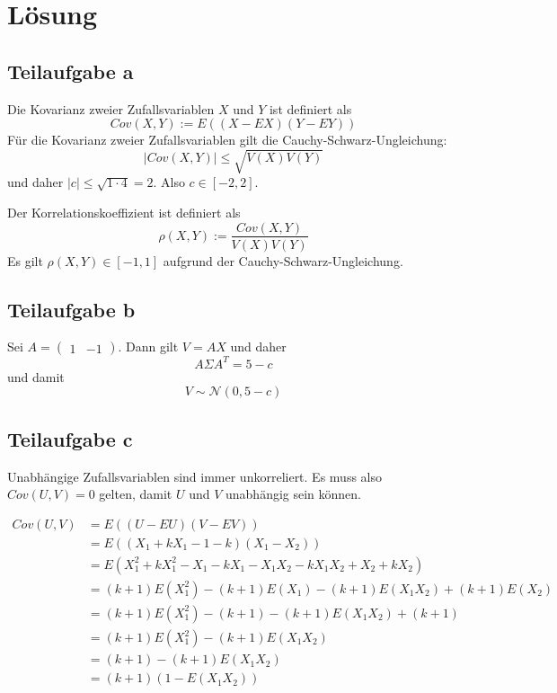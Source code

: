 \section*{Lösung}
\subsection*{Teilaufgabe a}
Die Kovarianz zweier Zufallsvariablen $X$ und $Y$ ist definiert als
\[Cov(X, Y) := E((X - EX) (Y - EY))\]
Für die Kovarianz zweier Zufallsvariablen gilt die Cauchy-Schwarz-Ungleichung:
\[|Cov(X, Y)| \leq \sqrt{V(X) V(Y)}\]
und daher $|c| \leq \sqrt{1 \cdot 4} = 2$. Also $c \in [-2, 2]$.

Der Korrelationskoeffizient ist definiert als
\[\rho(X, Y) := \frac{Cov(X, Y)}{V(X) V(Y)}\]
Es gilt $\rho(X, Y) \in [-1, 1]$ aufgrund der Cauchy-Schwarz-Ungleichung.

\subsection*{Teilaufgabe b}
Sei $A = \begin{pmatrix}1 & -1\end{pmatrix}$. Dann gilt $V = A X$ und daher
$$A \Sigma A^T = 5 - c$$ und damit
$$V \sim \mathcal{N}(0, 5 - c)$$

\subsection*{Teilaufgabe c}
Unabhängige Zufallsvariablen sind immer unkorreliert. Es muss also $Cov(U, V) = 0$
gelten, damit $U$ und $V$ unabhängig sein können.

\begin{align}
    Cov(U, V) &= E((U - EU) (V - EV))\\
              &= E((X_1 + k X_1 - 1 - k) (X_1 - X_2))\\
              &= E(X_1^2 + k X_1^2 - X_1 - k X_1 - X_1 X_2 - k X_1 X_2 + X_2 + k X_2)\\
              &= (k+1) E(X_1^2) - (k+1) E(X_1) - (k+1) E(X_1 X_2) + (k+1) E(X_2)\\
              &= (k+1) E(X_1^2) - (k+1) - (k+1) E(X_1 X_2) + (k+1)\\
              &= (k+1) E(X_1^2) - (k+1) E(X_1 X_2)\\
              &= (k+1) - (k+1) E(X_1 X_2)\\
              &= (k+1) (1 - E(X_1 X_2))
\end{align}

